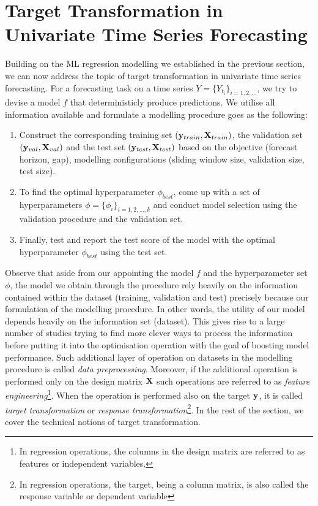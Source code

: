 \section{Target Transformation in Univariate Time Series Forecasting}

Building on the ML regression modelling we established in the previous section, we can now address the topic of target transformation in univariate time series forecasting. For a forecasting task on a time series $Y = \{ Y_{t_i} \}_{i = 1, 2, \ldots}$, we try to devise a model $f$ that deterministicly produce predictions. We utilise all information available and formulate a modelling procedure goes as the following:
\begin{enumerate}
    \item Construct the corresponding training set $(\mathbf{y}_{train}, \mathbf{X}_{train})$, the validation set $(\mathbf{y}_{val}, \mathbf{X}_{val})$ and the test set $(\mathbf{y}_{test}, \mathbf{X}_{test})$ based on the objective (forecast horizon, gap), modelling configurations (sliding window size, validation size, test size).
    \item To find the optimal hyperparameter $\phi_{best}$, come up with a set of hyperparameters $\phi = \{\phi_i \}_{i = 1, 2, \ldots, k}$ and conduct model selection using the validation procedure and the validation set.
    \item Finally, test and report the test score of the model with the optimal hyperparameter $\phi_{best}$ using the test set.
\end{enumerate}
Observe that aside from our appointing the model $f$ and the hyperparameter set $\phi$, the model we obtain through the procedure rely heavily on the information contained within the dataset (training, validation and test) precisely because our formulation of the modelling procedure. In other words, the utility of our model depends heavily on the information set (dataset). This gives rise to a large number of studies trying to find more clever ways to process the information before putting it into the optimisation operation with the goal of boosting model performance. Such additional layer of operation on datasets in the modelling procedure is called \textit{data preprocessing}. Moreover, if the additional operation is performed only on the design matrix $\mathbf{X}$ such operations are referred to as \textit{feature engineering}\footnote{In regression operations, the columns in the design matrix are referred to as features or independent variables.}. When the operation is performed also on the target $\mathbf{y}$, it is called \textit{target transformation} or \textit{response transformation}\footnote{In regression operations, the target, being a column matrix, is also called the response variable or dependent variable}. In the rest of the section, we cover the technical notions of target transformation.

